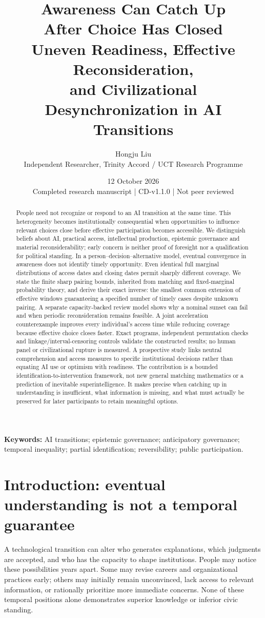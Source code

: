 \documentclass[11pt,a4paper]{article}
\title{\vspace{-1cm}\textbf{Awareness Can Catch Up\\After Choice Has Closed}\\[7pt]
\Large Uneven Readiness, Effective Reconsideration,\\and Civilizational Desynchronization in AI Transitions}
\author{Hongju Liu\\\normalsize Independent Researcher, Trinity Accord / UCT Research Programme}
\date{12 October 2026\\\small Completed research manuscript | CD-v1.1.0 | Not peer reviewed}
\theoremstyle{definition}\newtheorem{definition}{Definition}
\begin{document}
\maketitle\thispagestyle{plain}
\begin{abstract}
People need not recognize or respond to an AI transition at the same time. This heterogeneity becomes institutionally consequential when opportunities to influence relevant choices close before effective participation becomes accessible. We distinguish beliefs about AI, practical access, intellectual production, epistemic governance and material reconsiderability; early concern is neither proof of foresight nor a qualification for political standing. In a person--decision--alternative model, eventual convergence in awareness does not identify timely opportunity. Even identical full marginal distributions of access dates and closing dates permit sharply different coverage. We state the finite sharp pairing bounds, inherited from matching and fixed-marginal probability theory, and derive their exact inverse: the smallest common extension of effective windows guaranteeing a specified number of timely cases despite unknown pairing. A separate capacity-backed review model shows why a nominal sunset can fail and when periodic reconsideration remains feasible. A joint acceleration counterexample improves every individual's access time while reducing coverage because effective choice closes faster. Exact programs, independent permutation checks and linkage/interval-censoring controls validate the constructed results; no human panel or civilizational rupture is measured. A prospective study links neutral comprehension and access measures to specific institutional decisions rather than equating AI use or optimism with readiness. The contribution is a bounded identification-to-intervention framework, not new general matching mathematics or a prediction of inevitable superintelligence. It makes precise when catching up in understanding is insufficient, what information is missing, and what must actually be preserved for later participants to retain meaningful options.
\end{abstract}
\noindent\textbf{Keywords:} AI transitions; epistemic governance; anticipatory governance; temporal inequality; partial identification; reversibility; public participation.

\section{Introduction: eventual understanding is not a temporal guarantee}
\label{sec:intro}
A technological transition can alter who generates explanations, which judgments are accepted, and who has the capacity to shape institutions. People may notice these possibilities years apart. Some may revise careers and organizational practices early; others may initially remain unconvinced, lack access to relevant information, or rationally prioritize more immediate concerns. None of these temporal positions alone demonstrates superior knowledge or inferior civic standing.
\end{document}
